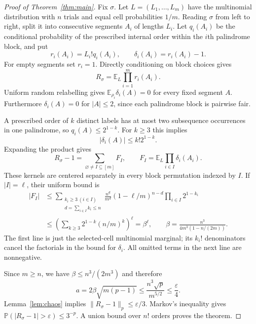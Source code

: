 \documentclass[11pt]{article}
\newcommand{\E}{\mathbb E}
\newcommand{\Prob}{\mathbb P}
\begin{document}
\begin{proof}[Proof of Theorem~\ref{thm:main}]
Fix $\sigma$. Let $L=(L_1,\ldots,L_m)$ have the multinomial distribution
with $n$ trials and equal cell probabilities $1/m$. Reading $\sigma$ from
left to right, split it into consecutive segments $A_i$ of lengths $L_i$.
Let $q_i(A_i)$ be the conditional probability of the prescribed internal
order within the $i$th palindrome block, and put
\[
 r_i(A_i)=L_i!q_i(A_i),\qquad \delta_i(A_i)=r_i(A_i)-1.
\]
For empty segments set $r_i=1$. Directly conditioning on block choices gives
\[
 R_\sigma=\E_L\prod_{i=1}^m r_i(A_i).
\]
Uniform random relabelling gives $\E_{\rho_i}\delta_i(A)=0$ for every fixed
segment $A$. Furthermore $\delta_i(A)=0$ for $|A|\leq2$, since each
palindrome block is pairwise fair.

A prescribed order of $k$ distinct labels has at most two subsequence
occurrences in one palindrome, so $q_i(A)\leq2^{1-k}$.
For $k\geq3$ this implies
\[
 |\delta_i(A)|\leq k!2^{1-k}.
\]
Expanding the product gives
\[
 R_\sigma-1=\sum_{\varnothing\ne I\subseteq[m]}F_I,
 \qquad F_I=\E_L\prod_{i\in I}\delta_i(A_i).
\]
These kernels are centered separately in every block permutation indexed
by $I$. If $|I|=\ell$, their uniform bound is
\begin{align*}
 |F_I|
 &\leq\sum_{\substack{k_i\geq3\ (i\in I)\\d=\sum_{i\in I}k_i\leq n}}
 \frac{n^{\underline d}}{m^d}
       (1-\ell/m)^{n-d}\prod_{i\in I}2^{1-k_i}\\
 &\leq\left(\sum_{k\geq3}2^{1-k}(n/m)^k\right)^\ell
 =\beta^\ell,
 \qquad \beta=\frac{n^3}{4m^3(1-n/(2m))}.
\end{align*}
The first line is just the selected-cell multinomial marginal; its
$k_i!$ denominators cancel the factorials in the bound for $\delta_i$.
All omitted terms in the next line are nonnegative.

Since $m\geq n$, we have $\beta\leq n^3/(2m^3)$ and therefore
\[
 a=2\beta\sqrt{m(p-1)}\leq\frac{n^3\sqrt p}{m^{5/2}}
 \leq\frac\varepsilon4.
\]
Lemma~\ref{lem:chaos} implies $\|R_\sigma-1\|_p\leq\varepsilon/3$.
Markov's inequality gives
$\Prob(|R_\sigma-1|>\varepsilon)\leq3^{-p}$.
A union bound over $n!$ orders proves the theorem.
\end{proof}
\end{document}
